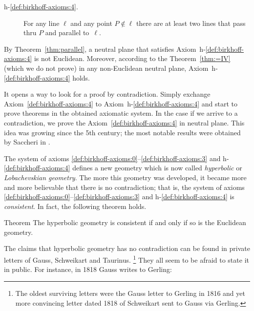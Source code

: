 \begin{framed}
\begin{description}
\item[{\rm h-$\!$\ref{def:birkhoff-axioms:4}.}]\label{def:hyperbolic-4a}  
For any line $\ell$ and any point $P\notin\ell$ 
there are at least two lines that pass thru $P$ and parallel to~$\ell$.
\end{description}
\end{framed}

By Theorem~\ref{thm:parallel}, a neutral plane that satisfies Axiom~h-$\!$\ref{def:birkhoff-axioms:4} is not Euclidean. 
Moreover, according to the Theorem~\ref{thm:=IV} (which we do not prove) 
in any non-Euclidean neutral plane, Axiom~h-$\!$\ref{def:birkhoff-axioms:4} holds.

It opens a way to look for a proof by contradiction.
Simply exchange  Axiom~\ref{def:birkhoff-axioms:4} to Axiom~h-$\!$\ref{def:birkhoff-axioms:4}
 and start to prove theorems in the obtained axiomatic system.
In the case if we arrive to a contradiction, 
we prove the Axiom~\ref{def:birkhoff-axioms:4} in neutral plane.
This idea was growing since the 5th century;
the most notable results were obtained by Saccheri in \cite{saccheri}.

The system of axioms \ref{def:birkhoff-axioms:0}--\ref{def:birkhoff-axioms:3} and h-$\!$\ref{def:birkhoff-axioms:4} defines a new geometry which is now called \emph{hyperbolic} or  \emph{Lobachevskian geometry}.
The more this geometry was developed,
it became more and more believable that there is no contradiction;
that is, the system of axioms \ref{def:birkhoff-axioms:0}--\ref{def:birkhoff-axioms:3} and h-$\!$\ref{def:birkhoff-axioms:4} is \emph{consistent}.
In fact, the following theorem holds.


\begin{thm}{Theorem}\label{thm:consistent}
The hyperbolic geometry is consistent if and only if so is the Euclidean geometry.
\end{thm}

The claims
that hyperbolic geometry has no contradiction can be found in private letters of
Gauss, 
Schweikart 
and Taurinus.%
\footnote{The oldest surviving letters were the Gauss letter to Gerling in 1816 
and yet more convincing letter dated 1818 
of Schweikart sent to Gauss via Gerling.}
They all seem to be afraid to state it in public.
For instance, in 1818 Gauss writes to Gerling:

